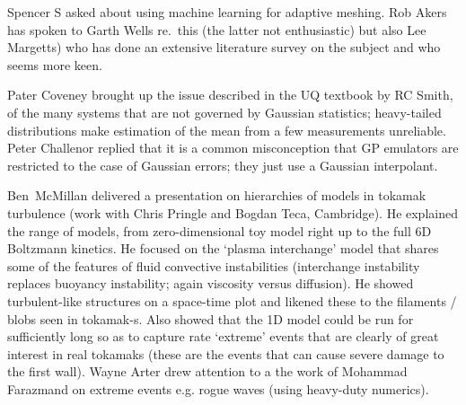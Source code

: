 Spencer S asked about using machine learning for adaptive meshing.  Rob Akers 
has spoken to Garth Wells re.\ this (the latter not enthusiastic) but also Lee 
Margetts) who has done an extensive literature survey on the subject and who 
seems more keen.

Pater Coveney brought up the issue described in the UQ textbook by RC Smith,
of the many systems that are not governed by 
Gaussian statistics; heavy-tailed distributions make estimation of the mean 
from a few measurements unreliable.  Peter Challenor replied
that it is a common misconception that GP emulators are restricted to the
case of Gaussian errors; they just use a Gaussian interpolant.

Ben~McMillan delivered a presentation on hierarchies of models in tokamak 
turbulence (work with Chris Pringle and Bogdan Teca, Cambridge).  He explained 
the range of models, from zero-dimensional toy model right up to the full 6D 
Boltzmann kinetics.  He focused on the `plasma interchange' model that shares 
some of the features of fluid convective instabilities (interchange instability 
replaces buoyancy instability; again viscosity versus diffusion).  He showed 
turbulent-like structures on a space-time plot and likened these to the 
filaments / blobs seen in tokamak-s.  Also showed that the 1D model could be run 
for sufficiently long so as to capture rate `extreme' events that are clearly 
of great interest in real tokamaks (these are the events that can cause severe 
damage to the first wall).  Wayne Arter drew attention to a the work
of Mohammad Farazmand on extreme events e.g. rogue waves (using heavy-duty numerics).
